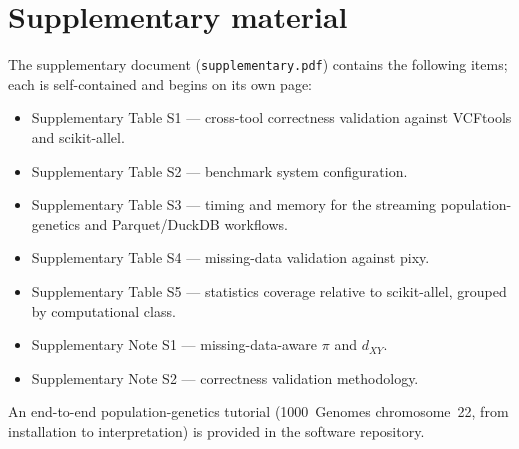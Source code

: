\documentclass[11pt]{article}
\begin{document}
\section*{Supplementary material}
The supplementary document (\texttt{supplementary.pdf}) contains the following
items; each is self-contained and begins on its own page:

\begin{itemize}\setlength{\itemsep}{2pt}
\item Supplementary Table S1 --- cross-tool correctness validation against VCFtools and scikit-allel.
\item Supplementary Table S2 --- benchmark system configuration.
\item Supplementary Table S3 --- timing and memory for the streaming population-genetics and Parquet/DuckDB workflows.
\item Supplementary Table S4 --- missing-data validation against pixy.
\item Supplementary Table S5 --- statistics coverage relative to scikit-allel, grouped by computational class.
\item Supplementary Note S1 --- missing-data-aware $\pi$ and $d_{XY}$.
\item Supplementary Note S2 --- correctness validation methodology.
\end{itemize}

\noindent An end-to-end population-genetics tutorial (1000~Genomes chromosome~22,
from installation to interpretation) is provided in the software repository.
\end{document}
